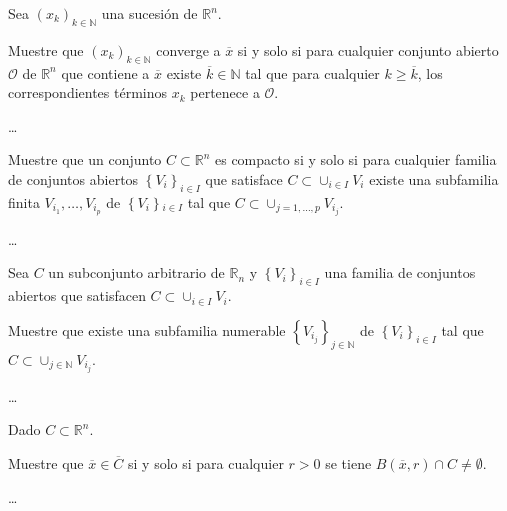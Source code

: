 \documentclass{testfcuni} %
\begin{document}
\begin{questions}

  \question

  Sea ${\left(x_{k}\right)}_{k\in\mathds{N}}$ una sucesión de
  $\mathds{R}^{n}$.

  Muestre que ${\left(x_{k}\right)}_{k\in\mathds{N}}$ converge a
  $\overline{x}$ si y solo si para cualquier conjunto abierto
  $\mathcal{O}$ de $\mathds{R}^{n}$ que contiene a $\overline{x}$
  existe $\overline{k}\in\mathds{N}$ tal que para cualquier
  $k\geq\overline{k}$, los correspondientes términos $x_{k}$
  pertenece a $\mathcal{O}$.

  \begin{solution}
    \ldots
  \end{solution}

  \question

  Muestre que un conjunto $C\subset\mathds{R}^{n}$ es compacto si y
  solo si para cualquier familia de conjuntos abiertos
  ${\left\{V_{i}\right\}}_{i\in I}$ que satisface
  $C\subset\cup_{i\in I}V_{i}$ existe una subfamilia finita
  $V_{i_{1}},\ldots,V_{i_{p}}$ de $\left\{V_{i}\right\}{}_{i\in I}$
  tal que $C\subset\cup_{j=1,\ldots,p}V_{i_{j}}$.

  \begin{solution}
    \ldots
  \end{solution}

  \question

  Sea $C$ un subconjunto arbitrario de $\mathds{R}_{n}$ y
  ${\left\{V_{i}\right\}}_{i\in I}$ una familia de conjuntos abiertos
  que satisfacen $C\subset\cup_{i\in I}V_{i}$.

  Muestre que existe una subfamilia numerable
  ${\left\{V_{i_{j}}\right\}}_{j\in\mathds{N}}$ de
  ${\left\{V_{i}\right\}}_{i\in I}$ tal que
  $C\subset\cup_{j\in\mathds{N}}V_{i_{j}}$.

  \begin{solution}
    \ldots
  \end{solution}

  \question

  Dado $C\subset\mathds{R}^{n}$.

  Muestre que $\overline{x}\in\overline{C}$ si y solo si para
  cualquier $r>0$ se tiene
  $B\left(\overline{x},r\right)\cap C\neq\emptyset$.

  \begin{solution}
    \ldots
  \end{solution}


\end{questions}
\end{document}
